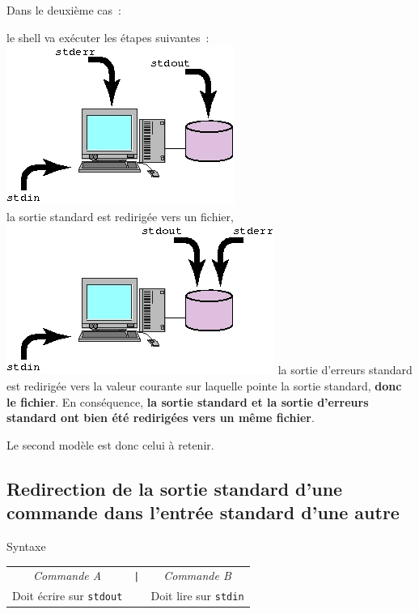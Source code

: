 Dans le deuxi{\`e}me cas~:
\begin{center}
\end{center}
le shell va ex{\'e}cuter les {\'e}tapes suivantes~:\\[0.5cm]
	\includegraphics{./_Images/basic-notions/stdout-stderr-2.jpg}	\\
la sortie standard est redirig{\'e}e vers un fichier,\\[0.5cm]
	\includegraphics{./_Images/basic-notions/stdout-stderr-3.jpg}
la sortie d'erreurs standard est redirig{\'e}e vers la valeur courante sur laquelle
pointe la sortie standard, {\bf donc le fichier}. En cons{\'e}quence,
{\bf la sortie standard et la sortie d'erreurs standard ont bien {\'e}t{\'e} redirig{\'e}es vers un
m{\^e}me fichier}.

Le second mod{\`e}le est donc celui {\`a} retenir.

\subsection{Redirection de la sortie standard d'une commande dans
		l'entr{\'e}e standard d'une autre}

\begin{definition}{Syntaxe}
\begin{tabular}{ccc}
	\textsl{Commande A}				&	\texttt{|}	&	\textsl{Commande B}	\\
	Doit {\'e}crire sur \texttt{stdout}	&			&	Doit lire sur \texttt{stdin}\\
\end{tabular}
\end{definition}

